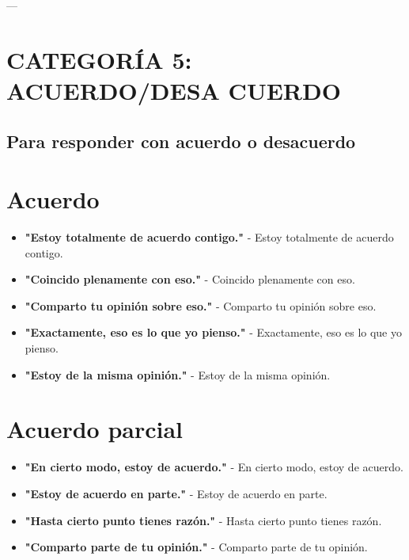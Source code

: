 \documentclass[a4paper,11pt]{article}
\begin{document}
\vspace{0.2cm}

---

\vspace{0.2cm}

\section{CATEGORÍA 5: ACUERDO/DESA CUERDO}

\vspace{0.2cm}

\subsection{Para responder con acuerdo o desacuerdo}

\vspace{0.2cm}

\section{Acuerdo}

\begin{itemize}

  \item \textbf{"Estoy totalmente de acuerdo contigo."} - Estoy totalmente de acuerdo contigo.

  \item \textbf{"Coincido plenamente con eso."} - Coincido plenamente con eso.

  \item \textbf{"Comparto tu opinión sobre eso."} - Comparto tu opinión sobre eso.

  \item \textbf{"Exactamente, eso es lo que yo pienso."} - Exactamente, eso es lo que yo pienso.

  \item \textbf{"Estoy de la misma opinión."} - Estoy de la misma opinión.

\end{itemize}

\vspace{0.2cm}

\section{Acuerdo parcial}

\begin{itemize}

  \item \textbf{"En cierto modo, estoy de acuerdo."} - En cierto modo, estoy de acuerdo.

  \item \textbf{"Estoy de acuerdo en parte."} - Estoy de acuerdo en parte.

  \item \textbf{"Hasta cierto punto tienes razón."} - Hasta cierto punto tienes razón.

  \item \textbf{"Comparto parte de tu opinión."} - Comparto parte de tu opinión.

\end{itemize}
\end{document}
